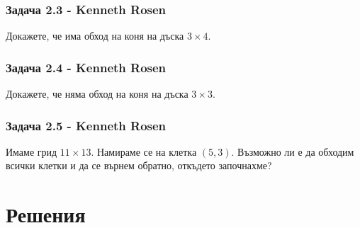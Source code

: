 \documentclass[12pt]{article}
\begin{document}
\subsubsection*{Задача 2.3 - Kenneth Rosen}
Докажете, че има обход на коня на дъска $3 \times 4$.
\subsubsection*{Задача 2.4 - Kenneth Rosen}
Докажете, че няма обход на коня на дъска $3 \times 3$.
\subsubsection*{Задача 2.5 - Kenneth Rosen}
Имаме грид $11 \times 13$. Намираме се на клетка $(5, 3)$. Възможно ли е да обходим всички клетки и да се върнем обратно, откъдето започнахме?

\section*{Решения}
\end{document}
